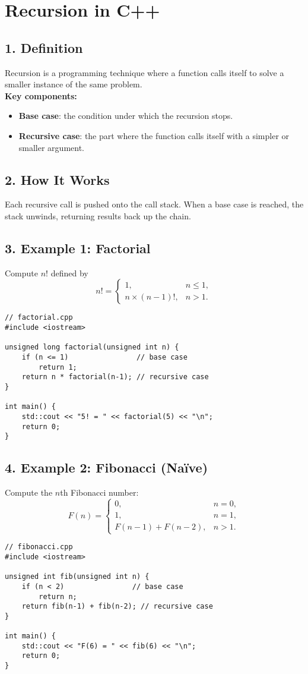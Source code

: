 \documentclass[11pt]{article}
\begin{document}
\section*{Recursion in C++}

\subsection*{1. Definition}
Recursion is a programming technique where a function calls itself to solve a smaller instance of the same problem.\\
\textbf{Key components:}
\begin{itemize}
  \item \textbf{Base case}: the condition under which the recursion stops.
  \item \textbf{Recursive case}: the part where the function calls itself with a simpler or smaller argument.
\end{itemize}

\subsection*{2. How It Works}
Each recursive call is pushed onto the call stack. When a base case is reached, the stack unwinds, returning results back up the chain.

\subsection*{3. Example 1: Factorial}
Compute \(n!\) defined by
\[
n! = 
\begin{cases}
1, & n \le 1,\\
n \times (n-1)!, & n > 1.
\end{cases}
\]
\begin{lstlisting}
// factorial.cpp
#include <iostream>

unsigned long factorial(unsigned int n) {
    if (n <= 1)                // base case
        return 1;
    return n * factorial(n-1); // recursive case
}

int main() {
    std::cout << "5! = " << factorial(5) << "\n";
    return 0;
}
\end{lstlisting}

\subsection*{4. Example 2: Fibonacci (Naïve)}
Compute the \(n\)th Fibonacci number:
\[
F(n) = 
\begin{cases}
0, & n = 0,\\
1, & n = 1,\\
F(n-1) + F(n-2), & n > 1.
\end{cases}
\]
\begin{lstlisting}
// fibonacci.cpp
#include <iostream>

unsigned int fib(unsigned int n) {
    if (n < 2)                // base case
        return n;
    return fib(n-1) + fib(n-2); // recursive case
}

int main() {
    std::cout << "F(6) = " << fib(6) << "\n";
    return 0;
}
\end{lstlisting}
\end{document}
